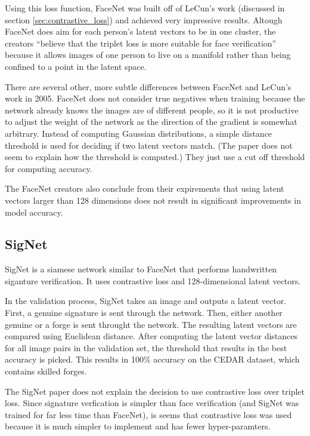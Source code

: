 Using this loss function, FaceNet was built off of LeCun's work (discussed in section \ref{sec:contrastive_loss}) and achieved very impressive results\cite{face_net}.
Altough FaceNet does aim for each person's latent vectors to be in one cluster, the creators ``believe that the triplet loss is more suitable for face verification'' because it allows images of one person to live on a manifold rather than being confined to a point in the latent space\cite{face_net}.

There are several other, more subtle differences between FaceNet and LeCun's work in 2005.
FaceNet does not consider true negatives when training because the network already knows the images are of different people, so it is not productive to adjust the weight of the network as the direction of the gradient is somewhat arbitrary.
Instead of computing Gaussian distributions, a simple distance threshold is used for deciding if two latent vectors match.
(The paper does not seem to explain how the threshold is computed.)
They just use a cut off threshold for computing accuracy.

The FaceNet creators also conclude from their expirements that using latent vectors larger than 128 dimensions does not result in significant improvements in model accuracy\cite{face_net}.


\subsection{SigNet}\label{sec:sig_net}

SigNet is a siamese network similar to FaceNet that performs handwritten siganture verification.
It uses contrastive loss and 128-dimensional latent vectors.

In the validation process, SigNet takes an image and outputs a latent vector.
First, a genuine signature is sent through the network.
Then, either another genuine or a forge is sent throught the network.
The resulting latent vectors are compared using Euclidean distance.
After computing the latent vector distances for all image pairs in the validation set, the threshold that results in the best accuracy is picked.
This results in 100\% accuracy on the CEDAR dataset, which contains skilled forges.

The SigNet paper does not explain the decision to use contrastive loss over triplet loss.
Since signature verfication is simpler than face verification (and SigNet was trained for far less time than FaceNet), is seems that contrastive loss was used because it is much simpler to implement and has fewer hyper-paramters.


